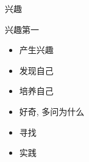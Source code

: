 \documentclass[dvipdfm]{beamer}
\begin{document}
\begin{frame}[t]{兴趣}
  \begin{block}{兴趣第一}
    \begin{itemize}
    \item  产生兴趣 \pause
    \item  发现自己 \pause
    \item  培养自己 \pause
    \item  好奇, 多问为什么 \pause
    \item  寻找 \pause
    \item  实践
    \end{itemize}
  \end{block}
\end{frame}
% 
\end{document}
